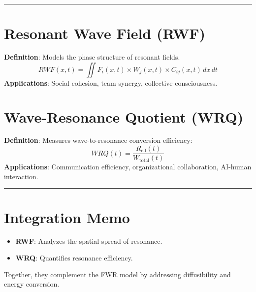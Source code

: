 \documentclass{article}
\begin{document}
\hrule

\section{Resonant Wave Field (RWF)}
\textbf{Definition}: Models the phase structure of resonant fields.
$$
RWF(x, t) = \iint F_i(x, t) \times W_j(x, t) \times C_{ij}(x, t) \, dx \, dt
$$
\textbf{Applications}: Social cohesion, team synergy, collective consciousness.

\section{Wave-Resonance Quotient (WRQ)}
\textbf{Definition}: Measures wave-to-resonance conversion efficiency:
$$
WRQ(t) = \frac{R_{\text{eff}}(t)}{W_{\text{total}}(t)}
$$
\textbf{Applications}: Communication efficiency, organizational collaboration, AI-human interaction.

\hrule

\section*{Integration Memo}
\begin{itemize}
    \item \textbf{RWF}: Analyzes the spatial spread of resonance.
    \item \textbf{WRQ}: Quantifies resonance efficiency.
\end{itemize}
Together, they complement the FWR model by addressing diffusibility and energy conversion.
\end{document}

